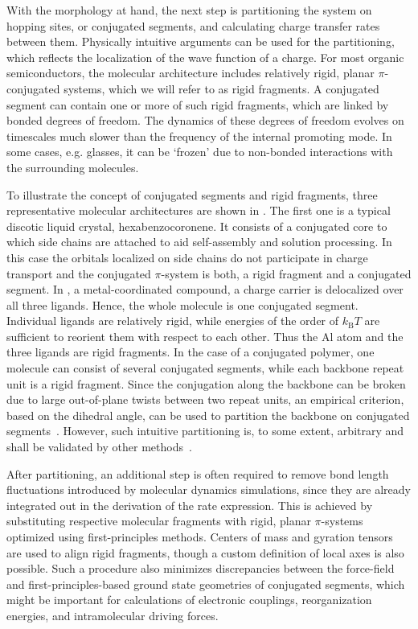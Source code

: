 With the morphology at hand, the next step is partitioning the system on hopping sites, or conjugated segments, and calculating charge transfer rates between them. Physically intuitive arguments can be used for the partitioning,  which reflects the localization of the wave function of a charge. For most organic semiconductors, the molecular architecture includes relatively rigid, planar $\pi$-conjugated systems, which we will refer to as rigid fragments. A conjugated segment can contain one or more of such rigid fragments, which are linked by bonded degrees of freedom. The dynamics of these degrees of freedom evolves on timescales much slower than the frequency of the internal promoting mode. In some cases, e.g. glasses, it can be `frozen' due to non-bonded interactions with the surrounding molecules.

To illustrate the concept of conjugated segments and rigid fragments, three representative molecular architectures are shown in . The first one is a typical discotic liquid crystal, hexabenzocoronene. It consists of a conjugated core to which side chains are attached to aid self-assembly and solution processing. In this case the orbitals localized on side chains do not participate in charge transport and the conjugated $\pi$-system is both, a rigid fragment and a conjugated segment. 
%
In \Alq, a metal-coordinated compound, a charge carrier is delocalized over all three ligands. Hence, the whole molecule is one conjugated segment. Individual ligands are relatively rigid, while energies of the order of $k_\text{B}T$ are sufficient to reorient them with respect to each other. Thus the Al atom and the three ligands are rigid fragments.
%
In the case of a conjugated polymer, one molecule can consist of several conjugated segments, while each backbone repeat unit is a rigid fragment. Since the conjugation along the backbone can be broken due to large out-of-plane twists between two repeat units, an empirical criterion, based on the dihedral angle, can be used to partition the backbone on conjugated segments~\cite{ruhle_multiscale_2010}. However, such intuitive partitioning is, to some extent, arbitrary and shall be validated by other methods~\cite{vukmirovic_charge_2008,vukmirovic_charge_2009,mcmahon_ad_2009}. 

After partitioning, an additional step is often required to remove bond length fluctuations introduced by molecular dynamics simulations, since they are already integrated out in the derivation of the rate expression. This is achieved by substituting respective molecular fragments with  rigid, planar $\pi$-systems optimized using first-principles methods. Centers of mass and gyration tensors are used to align rigid fragments, though a custom definition of local axes is also possible. Such a procedure also minimizes discrepancies between the force-field and first-principles-based ground state geometries of conjugated segments, which might be important for calculations of electronic couplings, reorganization energies, and intramolecular driving forces. 

